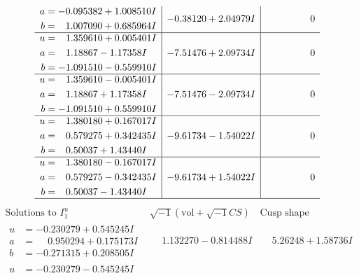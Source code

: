\documentclass[1p]{elsarticle_modified}
\theoremstyle{definition}
\newcommand{\I}{\sqrt{-1}}
\begin{document}
$$\begin{array}{c|c|c}
\begin{aligned}
a &= -0.095382 + 1.008510 I \\
b &= \phantom{-}1.007090 + 0.685964 I\end{aligned}
 & -0.38120 + 2.04979 I & \phantom{-0.000000 } 0 \\ \hline\begin{aligned}
u &= \phantom{-}1.359610 + 0.005401 I \\
a &= \phantom{-}1.18867 - 1.17358 I \\
b &= -1.091510 - 0.559910 I\end{aligned}
 & -7.51476 + 2.09734 I & \phantom{-0.000000 } 0 \\ \hline\begin{aligned}
u &= \phantom{-}1.359610 - 0.005401 I \\
a &= \phantom{-}1.18867 + 1.17358 I \\
b &= -1.091510 + 0.559910 I\end{aligned}
 & -7.51476 - 2.09734 I & \phantom{-0.000000 } 0 \\ \hline\begin{aligned}
u &= \phantom{-}1.380180 + 0.167017 I \\
a &= \phantom{-}0.579275 + 0.342435 I \\
b &= \phantom{-}0.50037 + 1.43440 I\end{aligned}
 & -9.61734 - 1.54022 I & \phantom{-0.000000 } 0 \\ \hline\begin{aligned}
u &= \phantom{-}1.380180 - 0.167017 I \\
a &= \phantom{-}0.579275 - 0.342435 I \\
b &= \phantom{-}0.50037 - 1.43440 I\end{aligned}
 & -9.61734 + 1.54022 I & \phantom{-0.000000 } 0\\
 \hline 
 \end{array}$$\newpage$$\begin{array}{c|c|c}  
\text{Solutions to }I^u_{1}& \I (\text{vol} + \sqrt{-1}CS) & \text{Cusp shape}\\
 \hline 
\begin{aligned}
u &= -0.230279 + 0.545245 I \\
a &= \phantom{-}0.950294 + 0.175173 I \\
b &= -0.271315 + 0.208505 I\end{aligned}
 & \phantom{-}1.132270 - 0.814488 I & \phantom{-}5.26248 + 1.58736 I \\ \hline\begin{aligned}
u &= -0.230279 - 0.545245 I \\

\end{aligned}
\end{array}$$
\end{document}
